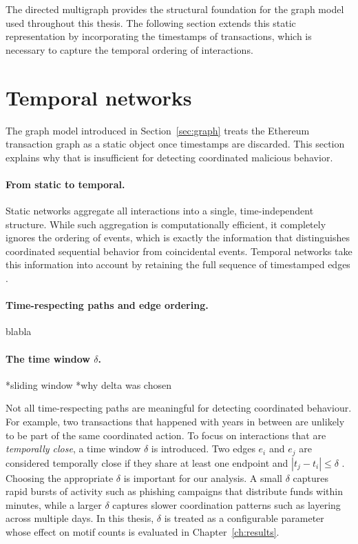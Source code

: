 \documentclass{thesisclass}
\begin{document}
The directed multigraph provides the structural foundation for the graph model 
used throughout this thesis. The following section extends this static 
representation by incorporating the timestamps of transactions, which is 
necessary to capture the temporal ordering of interactions.


\section{Temporal networks}
\label{sec:temporal_networks}
The graph model introduced in Section~\ref{sec:graph} treats the Ethereum transaction graph as a static object once timestamps are discarded. This section explains why that is insufficient for detecting coordinated malicious behavior.

\paragraph{From static to temporal.}
Static networks aggregate all interactions into a single, time-independent structure. While such aggregation is computationally efficient, it completely ignores the ordering of events, which is exactly the information that distinguishes coordinated sequential behavior from coincidental events. Temporal networks take this information into account by retaining the full sequence of timestamped edges \cite{kovanen2011temporal, paranjape2017motifs}.

\paragraph{Time-respecting paths and edge ordering.}
blabla


\paragraph{The time window $\delta$.}
*sliding window
*why delta was chosen

Not all time-respecting paths are meaningful for detecting coordinated behaviour. For example, two transactions that happened with years in between are unlikely to be part of the same coordinated action. To focus on interactions that are \emph{temporally close}, a time window $\delta$ is introduced. Two edges $e_i$ and $e_j$ are considered temporally close if they share at least one endpoint and $|t_j - t_i| \leq \delta$ \cite{kovanen2011temporal, paranjape2017motifs}. Choosing the appropriate $\delta$ is important for our analysis. A small $\delta$ captures rapid bursts of activity such as phishing campaigns that distribute funds within minutes, while a larger $\delta$ captures slower coordination patterns such as layering across multiple days. In this thesis, $\delta$ is treated as a configurable parameter whose effect on motif counts is evaluated in Chapter~\ref{ch:results}. %
\end{document}
